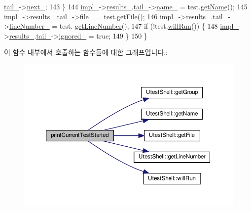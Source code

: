 \begin{DoxyCode}
      \hyperlink{struct_j_unit_test_group_result_a4d358acecdc5260d58b9d2fc96fe107a}{tail\_}->\hyperlink{struct_j_unit_test_case_result_node_a071cdad5d255e499920e0f7fb745f94a}{next\_};
143     \}
144     \hyperlink{class_j_unit_test_output_a123a6133cd44cdaa2c63a519f9fb56f4}{impl\_}->\hyperlink{struct_j_unit_test_output_impl_a4efee5ceef62d8079916e9bd0beb9ba0}{results\_}.\hyperlink{struct_j_unit_test_group_result_a4d358acecdc5260d58b9d2fc96fe107a}{tail\_}->\hyperlink{struct_j_unit_test_case_result_node_aac73c86e1e892f392d1fc423e25f51a8}{name\_} = test.\hyperlink{class_utest_shell_a454500e4f7023136a9a6a956323e3a77}{getName}();
145     \hyperlink{class_j_unit_test_output_a123a6133cd44cdaa2c63a519f9fb56f4}{impl\_}->\hyperlink{struct_j_unit_test_output_impl_a4efee5ceef62d8079916e9bd0beb9ba0}{results\_}.\hyperlink{struct_j_unit_test_group_result_a4d358acecdc5260d58b9d2fc96fe107a}{tail\_}->\hyperlink{struct_j_unit_test_case_result_node_a8039b5fa783b1cde83ede18ddd9ada38}{file\_} = test.\hyperlink{class_utest_shell_ac086867db63bc447ebef78844034d289}{getFile}();
146     \hyperlink{class_j_unit_test_output_a123a6133cd44cdaa2c63a519f9fb56f4}{impl\_}->\hyperlink{struct_j_unit_test_output_impl_a4efee5ceef62d8079916e9bd0beb9ba0}{results\_}.\hyperlink{struct_j_unit_test_group_result_a4d358acecdc5260d58b9d2fc96fe107a}{tail\_}->\hyperlink{struct_j_unit_test_case_result_node_ab83f5a7389dae9b8045aa6fbf55b153a}{lineNumber\_} = test.
      \hyperlink{class_utest_shell_ae48a165945bebe01fd777069441e614e}{getLineNumber}();
147     \textcolor{keywordflow}{if} (!test.\hyperlink{class_utest_shell_afa35d9bf0fd1c772b04f48d89d318a70}{willRun}()) \{
148         \hyperlink{class_j_unit_test_output_a123a6133cd44cdaa2c63a519f9fb56f4}{impl\_}->\hyperlink{struct_j_unit_test_output_impl_a4efee5ceef62d8079916e9bd0beb9ba0}{results\_}.\hyperlink{struct_j_unit_test_group_result_a4d358acecdc5260d58b9d2fc96fe107a}{tail\_}->\hyperlink{struct_j_unit_test_case_result_node_a080bf1251153ebc55b9b430fd869e147}{ignored\_} = \textcolor{keyword}{true};
149     \}
150 \}
\end{DoxyCode}


이 함수 내부에서 호출하는 함수들에 대한 그래프입니다.\+:
\nopagebreak
\begin{figure}[H]
\begin{center}
\leavevmode
\includegraphics[width=350pt]{class_j_unit_test_output_a5b7509d804ba2fb3be690077ae93345a_cgraph}
\end{center}
\end{figure}


